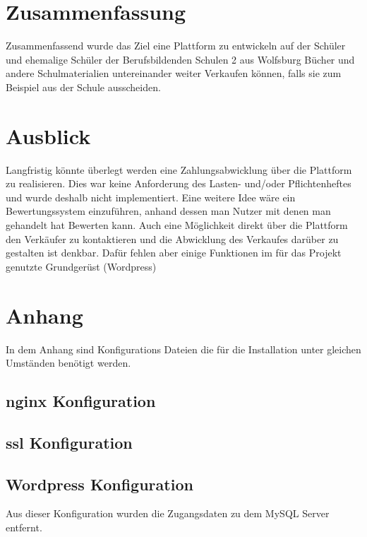 \documentclass[a4paper, DIV20, 11pt, headsepline, parskip]{article}
\begin{document}
\section{Zusammenfassung}
Zusammenfassend wurde das Ziel eine Plattform zu entwickeln auf der Schüler und ehemalige Schüler der Berufsbildenden Schulen 2 aus Wolfsburg Bücher und andere Schulmaterialien untereinander weiter Verkaufen können, falls sie zum Beispiel aus der Schule ausscheiden.
\section{Ausblick}
Langfristig könnte überlegt werden eine Zahlungsabwicklung über die Plattform zu realisieren.
Dies war keine Anforderung des Lasten- und/oder Pflichtenheftes und wurde deshalb nicht implementiert.
Eine weitere Idee wäre ein Bewertungssystem einzuführen, anhand dessen man Nutzer mit denen man gehandelt hat Bewerten kann.
Auch eine Möglichkeit direkt über die Plattform den Verkäufer zu kontaktieren und die Abwicklung des Verkaufes darüber zu gestalten ist denkbar.
Dafür fehlen aber einige Funktionen im für das Projekt genutzte Grundgerüst (Wordpress)
\section{Anhang}
In dem Anhang sind Konfigurations Dateien die für die Installation unter gleichen Umständen benötigt werden.
\subsection{nginx Konfiguration}

\subsection{ssl Konfiguration}

\subsection{Wordpress Konfiguration}
Aus dieser Konfiguration wurden die Zugangsdaten zu dem MySQL Server entfernt.

\pagebreak
\end{document}

